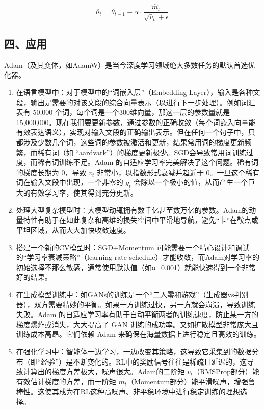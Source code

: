 \[
\theta_t = \theta_{t-1} - \alpha \cdot \frac{\hat{m}_t}{\sqrt{\hat{v}_t}+\epsilon}
\]

\hypertarget{ux56dbux5e94ux7528}{%
\subsection{四、应用}\label{ux56dbux5e94ux7528}}

Adam（及其变体，如AdamW）是当今深度学习领域绝大多数任务的默认首选优化器。

\begin{enumerate}
\def\labelenumi{\arabic{enumi}.}
\item
  在语言模型中：对于模型中的``词嵌入层''（Embedding Layer），输入是各种文段，输出是需要的对该文段的综合向量表示（以进行下一步处理）。例如词汇表有 50,000 个词，每个词是一个300维向量，那这一层的参数量就是15,000,000。现在我们要更新参数，通过参数的正确收敛（每个词嵌入向量能有效表达语义），实现对输入文段的正确输出表示。但在任何一个句子中，只都涉及少数几个词，这些词的参数被激活和更新，结果常用词的梯度更新频繁，而稀有词（如 ``aardvark''）的梯度更新极少。SGD会导致常用词训练过度，而稀有词训练不足。Adam 的自适应学习率完美解决了这个问题。稀有词的梯度长期为 \(0\)，导致 \(v_t\) 非常小，以指数形式衰减并趋近于 \(0\)。一旦这个稀有词在输入文段中出现，一个非零的 \(g_t\) 会除以一个极小的值，从而产生一个巨大的有效学习率，使其得到充分更新。
\item
  处理大型复杂模型时：大模型动辄拥有数千亿甚至数万亿的参数。Adam的动量特性有助于在如此复杂和高维的损失空间中平滑地导航，避免``卡''在鞍点或平坦区域，从而大大加快收敛速度。
\item
  搭建一个新的CV模型时：SGD+Momentum 可能需要一个精心设计和调试的``学习率衰减策略''（learning rate schedule）才能收敛，而Adam对学习率的初始选择不那么敏感，通常使用默认值（如α=0.001）就能快速得到一个非常好的结果。
\item
  在生成模型训练中：如GANs的训练是一个``二人零和游戏''（生成器vs判别器），双方需要精妙的平衡。如果一方训练过快，另一方就会崩溃，导致训练失败。Adam 的自适应学习率有助于自动平衡两者的训练速度，防止某一方的梯度爆炸或消失，大大提高了 GAN 训练的成功率。又如扩散模型非常庞大且训练成本高昂。它们依赖 Adam 来确保在海量数据上进行稳定且高效的训练。
\item
  在强化学习中：智能体一边学习，一边改变其策略，这导致它采集到的数据分布（即``经验''）是不断变化的。RL中的奖励信号往往是稀疏且延迟的，这导致计算出的梯度方差极大，噪声很大。Adam的二阶矩 \(v_t\)（RMSProp部分）能有效估计梯度的方差，而一阶矩 \(m_t\)（Momentum部分）能平滑噪声，增强鲁棒性。这使其成为在RL这种高噪声、非平稳环境中进行稳定训练的理想选择。
\end{enumerate}

